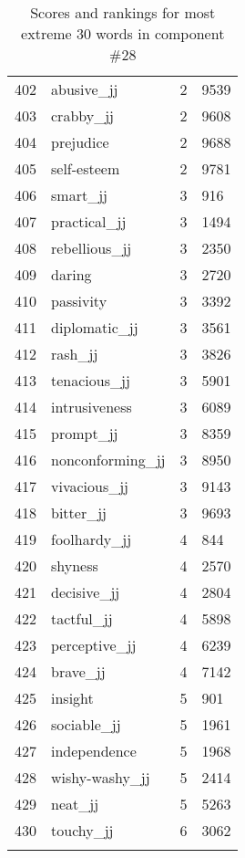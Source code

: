 \begin{longtable}[!htbp]{| rlr@{.}l |}
    402 & abusive\_jj & 2 & 9539 \\
    403 & crabby\_jj & 2 & 9608 \\
    404 & prejudice & 2 & 9688 \\
    405 & self-esteem & 2 & 9781 \\
    406 & smart\_jj & 3 & 916 \\
    407 & practical\_jj & 3 & 1494 \\
    408 & rebellious\_jj & 3 & 2350 \\
    409 & daring & 3 & 2720 \\
    410 & passivity & 3 & 3392 \\
    411 & diplomatic\_jj & 3 & 3561 \\
    412 & rash\_jj & 3 & 3826 \\
    413 & tenacious\_jj & 3 & 5901 \\
    414 & intrusiveness & 3 & 6089 \\
    415 & prompt\_jj & 3 & 8359 \\
    416 & nonconforming\_jj & 3 & 8950 \\
    417 & vivacious\_jj & 3 & 9143 \\
    418 & bitter\_jj & 3 & 9693 \\
    419 & foolhardy\_jj & 4 & 844 \\
    420 & shyness & 4 & 2570 \\
    421 & decisive\_jj & 4 & 2804 \\
    422 & tactful\_jj & 4 & 5898 \\
    423 & perceptive\_jj & 4 & 6239 \\
    424 & brave\_jj & 4 & 7142 \\
    425 & insight & 5 & 901 \\
    426 & sociable\_jj & 5 & 1961 \\
    427 & independence & 5 & 1968 \\
    428 & wishy-washy\_jj & 5 & 2414 \\
    429 & neat\_jj & 5 & 5263 \\
    430 & touchy\_jj & 6 & 3062 \\
    \hline
    \caption{Scores and rankings for most extreme 30 words in component \#28} \\
\end{longtable}

